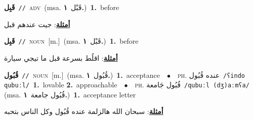 \documentclass[10pt,a4paper,twoside]{article} %
\begin{document}
\begin{multicols}{2}
{{{{{{{{{{{{\setlength\topsep{0pt}\textbf{\foreignlanguage{arabic}{قَبِل}}\ {\color{gray}\texttt{//}\color{black}}\ \textsc{adv}\ \color{gray}(msa. \foreignlanguage{arabic}{قَبْل}~\foreignlanguage{arabic}{\textbf{١.}})\color{black}\ \textbf{1.}~before\  \begin{flushright}\color{gray}\foreignlanguage{arabic}{\textbf{\underline{\foreignlanguage{arabic}{أمثلة}}}: جيت عندهم قبل}\end{flushright}\color{black}} \vspace{2mm}

{\setlength\topsep{0pt}\textbf{\foreignlanguage{arabic}{قَبِل}}\ {\color{gray}\texttt{//}\color{black}}\ \textsc{noun}\ [m.]\ \color{gray}(msa. \foreignlanguage{arabic}{قَبْل}~\foreignlanguage{arabic}{\textbf{١.}})\color{black}\ \textbf{1.}~before\  \begin{flushright}\color{gray}\foreignlanguage{arabic}{\textbf{\underline{\foreignlanguage{arabic}{أمثلة}}}: اقلُط بسرعة قبل ما تيجي سيارة}\end{flushright}\color{black}} \vspace{2mm}

{\setlength\topsep{0pt}\textbf{\foreignlanguage{arabic}{قُبُول}}\ {\color{gray}\texttt{//}\color{black}}\ \textsc{noun}\ [m.]\ \color{gray}(msa. \foreignlanguage{arabic}{قُبُول}~\foreignlanguage{arabic}{\textbf{١.}})\color{black}\ \textbf{1.}~acceptance\ \ $\bullet$\ \ \textsc{ph.} \color{gray} \foreignlanguage{arabic}{عنده قُبُول}\color{black}\ {\color{gray}\texttt{/{\sffamily ʕindo qubuːl}/}\color{black}}\ \textbf{1.}~lovable  \textbf{2.}~approachable\ \ $\bullet$\ \ \textsc{ph.} \color{gray} \foreignlanguage{arabic}{قُبُول جَامعة}\color{black}\ {\color{gray}\texttt{/{\sffamily qubuːl (dʒ)aːmʕa}/}\color{black}}\ \color{gray} (msa. \foreignlanguage{arabic}{قُبُول جامعة}~\foreignlanguage{arabic}{\textbf{١.}})\color{black}\ \textbf{1.}~acceptance letter\  \begin{flushright}\color{gray}\foreignlanguage{arabic}{\textbf{\underline{\foreignlanguage{arabic}{أمثلة}}}: سبحان الله هالزلمة عنده قُبُول وكل الناس بتحبه}\end{flushright}\color{black}} \vspace{2mm}

}}}}}}}}}}}
\end{multicols}
\end{document}
